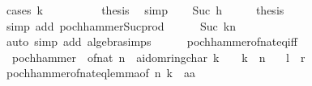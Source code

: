 \begin{isabellebody}
\ {\isacharparenleft}{\kern0pt}cases\ k{\isacharparenright}{\kern0pt}\isanewline
\ \ \isamarkupfalse%
\ {}\isanewline
\ \ \isamarkupfalse%
\ \isamarkupfalse%
\ {\isacharquery}{\kern0pt}thesis\ \isamarkupfalse%
\ simp\isanewline
{}\isamarkupfalse%
\isanewline
\ \ \isamarkupfalse%
\ {\isacharparenleft}{\kern0pt}Suc\ h{\isacharparenright}{\kern0pt}\isanewline
\ \ \isamarkupfalse%
\ \isamarkupfalse%
\ {\isacharquery}{\kern0pt}thesis\isanewline
\ \ \ \ \isamarkupfalse%
\ {\isacharparenleft}{\kern0pt}simp\ add{\isacharcolon}{\kern0pt}\ pochhammer{\isacharunderscore}{\kern0pt}Suc{\isacharunderscore}{\kern0pt}prod{\isacharparenright}{\kern0pt}\isanewline
\ \ \ \ \isamarkupfalse%
\ Suc\ kn\isanewline
\ \ \ \ \isamarkupfalse%
\ {\isacharparenleft}{\kern0pt}auto\ simp\ add{\isacharcolon}{\kern0pt}\ algebra{\isacharunderscore}{\kern0pt}simps{\isacharparenright}{\kern0pt}\isanewline
\ \ \ \ \isamarkupfalse%
\isanewline
{}\isamarkupfalse%
%
\endisatagproof
{\isafoldproof}%
%
\isadelimproof
\isanewline
%
\endisadelimproof
\isanewline
{}\isamarkupfalse%
\ pochhammer{\isacharunderscore}{\kern0pt}of{\isacharunderscore}{\kern0pt}nat{\isacharunderscore}{\kern0pt}eq{\isacharunderscore}{\kern0pt}{}{\isacharunderscore}{\kern0pt}iff{\isacharcolon}{\kern0pt}\isanewline
\ \ {\isachardoublequoteopen}pochhammer\ {\isacharparenleft}{\kern0pt}{\isacharminus}{\kern0pt}\ {\isacharparenleft}{\kern0pt}of{\isacharunderscore}{\kern0pt}nat\ n\ {\isacharcolon}{\kern0pt}{\isacharcolon}{\kern0pt}\ {\isacharprime}{\kern0pt}a{\isacharcolon}{\kern0pt}{\isacharcolon}{\kern0pt}{\isacharbraceleft}{\kern0pt}idom{\isacharcomma}{\kern0pt}ring{\isacharunderscore}{\kern0pt}char{\isacharunderscore}{\kern0pt}{}{\isacharbraceright}{\kern0pt}{\isacharparenright}{\kern0pt}{\isacharparenright}{\kern0pt}\ k\ {\isacharequal}{\kern0pt}\ {}\ {\isasymlongleftrightarrow}\ k\ {\isachargreater}{\kern0pt}\ n{\isachardoublequoteclose}\isanewline
\ \ {\isacharparenleft}{\kern0pt}\ {\isachardoublequoteopen}{\isacharquery}{\kern0pt}l\ {\isacharequal}{\kern0pt}\ {\isacharquery}{\kern0pt}r{\isachardoublequoteclose}{\isacharparenright}{\kern0pt}\isanewline
%
\isadelimproof
\ \ %
\endisadelimproof
%
\isatagproof
{}\isamarkupfalse%
\ pochhammer{\isacharunderscore}{\kern0pt}of{\isacharunderscore}{\kern0pt}nat{\isacharunderscore}{\kern0pt}eq{\isacharunderscore}{\kern0pt}{}{\isacharunderscore}{\kern0pt}lemma{\isacharbrackleft}{\kern0pt}of\ n\ k{\isacharcomma}{\kern0pt}\ \ {\isacharquery}{\kern0pt}{\isacharprime}{\kern0pt}a{\isacharequal}{\kern0pt}{\isacharprime}{\kern0pt}a{\isacharbrackright}{\kern0pt}\isanewline

\end{isabellebody}
